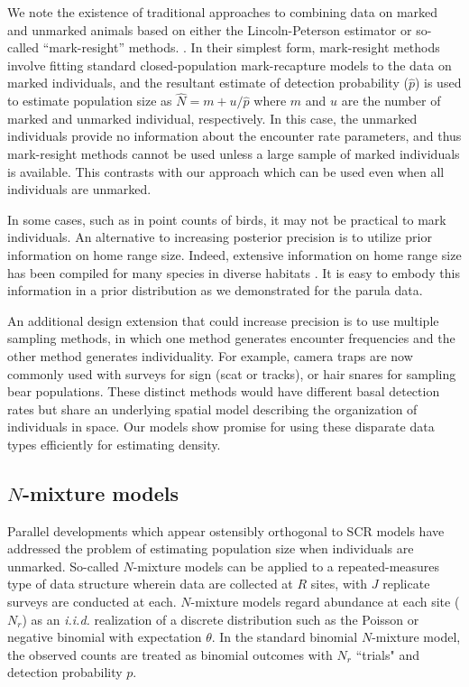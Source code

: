 We note the existence of traditional approaches to combining data on
marked and unmarked animals based on either the Lincoln-Peterson
estimator or so-called ``mark-resight'' methods.
\citep{bartmann_etal:1987, mintaMangel:89, mcclintockHoeting:09}. In their
simplest form, mark-resight methods involve fitting standard
closed-population mark-recapture models to the data on marked
individuals, and the resultant estimate of detection probability
($\hat{p}$) is used to estimate population size as $\hat{N} = m +
u/\hat{p}$ where $m$ and $u$ are the number of
marked and unmarked individual, respectively. In this case,
the unmarked individuals provide no information about the
encounter rate parameters, and thus mark-resight methods cannot be
used unless a large sample of marked individuals is available. This
contrasts with our approach which can be used even when all
individuals are unmarked.

In some cases, such as in point counts of birds, it may not be
practical to mark individuals. An alternative to increasing posterior
precision is to utilize prior information on
home range size. Indeed, extensive information on home range size has
been compiled for many species in diverse habitats %
\citep[\emph{e.g.},][]{degraaf_yamasaki:2001}. It is
easy to embody this information in a prior distribution as we
demonstrated for the parula data.

An additional design extension that could increase precision is to use
multiple sampling methods, in which one method generates encounter
frequencies and the other method generates individuality.
For example, camera traps are now commonly used with surveys for
sign (scat or tracks), or hair snares for sampling bear populations.
These distinct methods would have different basal detection
rates but share an underlying spatial model describing the
organization of individuals in space.
Our models show promise for using
these disparate data types efficiently
for estimating density.


\subsection{$N$-mixture models}

Parallel developments which appear ostensibly
orthogonal to SCR models have addressed the problem of estimating
population size when individuals are unmarked. So-called
$N$-mixture models \citep{royle:2004abc, royle:2004biom, royle_etal_2004}
can be applied to a repeated-measures type of data structure
wherein  data are collected at $R$ sites, with $J$
replicate surveys are conducted at each.
$N$-mixture models regard abundance at each site ($N_r$) as an
{\it i.i.d.} realization of a discrete distribution such as the
Poisson or negative binomial with expectation $\theta$. In the
standard binomial $N$-mixture model, the observed counts are
treated as binomial outcomes with $N_r$ ``trials" and detection
probability $p$.

